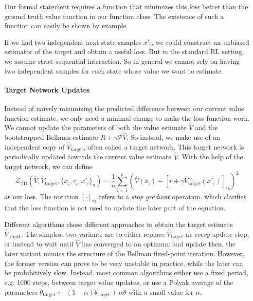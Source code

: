 Our formal statement requires a function that minimizes this loss better than the ground truth value function in our function class.
The existence of such a function can easily be shown by example.

If we had two independent next state samples $x'_i$, we could construct an unbiased estimator of the target and obtain a useful loss.
But in the standard RL setting, we assume strict sequential interaction.
So in general we cannot rely on having two independent samples for each state whose value we want to estimate.

\paragraph{Target Network Updates}

Instead of naively minimizing the predicted difference between our current value function estimate, we only need a minimal change to make the loss function work.
We cannot update the parameters of both the value estimate $\hat{V}$ and the bootstrapped Bellman estimate $R + \gamma \mathcal{P} \hat{V}$.
So instead, we make use of an independent copy of $\hat{V}_\mathrm{target}$, often called a target network. 
This target network is periodically updated towards the current value estimate $\hat{V}$.
With the help of the target network, we can define
\[
    \mathcal{L}_\mathrm{TD}\left(\hat{V}, \hat{V}_\mathrm{target}, \{x_i, r_i, x'_i\}_{n}\right) = \frac{1}{n} \sum_{i=1}^n \left(\hat{V}(x_i) - \left[r + \gamma \hat{V}_\mathrm{target}(x'_i)\right]_\mathrm{sg}\right)^2
\]
as our loss.
The notation $[\cdot]_\mathrm{sg}$ refers to a \emph{stop gradient} operation, which clarifies that the loss function is not used to update the later part of the equation.

Different algorithms chose different approaches to obtain the target estimate $\hat{V}_\mathrm{target}$.
The simplest two variants are to either replace $\hat{V}_\mathrm{target}$ at \emph{every} update step, or instead to wait until $\hat{V}$ has converged to an optimum and update then.
the later variant mimics the structure of the Bellman fixed-point iteration.
However, the former version can prove to be very unstable in practice, while the later can be prohibitively slow.
Instead, most common algorithms either use a fixed period, e.g. 1000 steps, between target value updates, or use a Polyak average of the parameters $\theta_\mathrm{target} \leftarrow (1 - \alpha) \theta_\mathrm{target} + \alpha \theta$ with a small value for $\alpha$.

